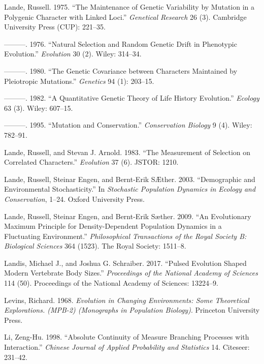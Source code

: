 \documentclass[]{article}
\begin{document}
\leavevmode\hypertarget{ref-Lande1975}{}%
Lande, Russell. 1975. ``The Maintenance of Genetic Variability by
Mutation in a Polygenic Character with Linked Loci.'' \emph{Genetical
Research} 26 (3). Cambridge University Press (CUP): 221--35.

\leavevmode\hypertarget{ref-Lande1976}{}%
---------. 1976. ``Natural Selection and Random Genetic Drift in
Phenotypic Evolution.'' \emph{Evolution} 30 (2). Wiley: 314--34.

\leavevmode\hypertarget{ref-pmid17248993}{}%
---------. 1980. ``The Genetic Covariance between Characters Maintained
by Pleiotropic Mutations.'' \emph{Genetics} 94 (1): 203--15.

\leavevmode\hypertarget{ref-Lande1982}{}%
---------. 1982. ``A Quantitative Genetic Theory of Life History
Evolution.'' \emph{Ecology} 63 (3). Wiley: 607--15.

\leavevmode\hypertarget{ref-Lande1995}{}%
---------. 1995. ``Mutation and Conservation.'' \emph{Conservation
Biology} 9 (4). Wiley: 782--91.

\leavevmode\hypertarget{ref-Lande1983}{}%
Lande, Russell, and Stevan J. Arnold. 1983. ``The Measurement of
Selection on Correlated Characters.'' \emph{Evolution} 37 (6). JSTOR:
1210.

\leavevmode\hypertarget{ref-Lande2003}{}%
Lande, Russell, Steinar Engen, and Bernt-Erik SÆther. 2003.
``Demographic and Environmental Stochasticity.'' In \emph{Stochastic
Population Dynamics in Ecology and Conservation}, 1--24. Oxford
University Press.

\leavevmode\hypertarget{ref-Lande2009}{}%
Lande, Russell, Steinar Engen, and Bernt-Erik Sæther. 2009. ``An
Evolutionary Maximum Principle for Density-Dependent Population Dynamics
in a Fluctuating Environment.'' \emph{Philosophical Transactions of the
Royal Society B: Biological Sciences} 364 (1523). The Royal Society:
1511--8.

\leavevmode\hypertarget{ref-Landis2017}{}%
Landis, Michael J., and Joshua G. Schraiber. 2017. ``Pulsed Evolution
Shaped Modern Vertebrate Body Sizes.'' \emph{Proceedings of the National
Academy of Sciences} 114 (50). Proceedings of the National Academy of
Sciences: 13224--9.

\leavevmode\hypertarget{ref-9780691080628}{}%
Levins, Richard. 1968. \emph{Evolution in Changing Environments: Some
Theoretical Explorations. (MPB-2) (Monographs in Population Biology)}.
Princeton University Press.

\leavevmode\hypertarget{ref-zeng1998absolute}{}%
Li, Zeng-Hu. 1998. ``Absolute Continuity of Measure Branching Processes
with Interaction.'' \emph{Chinese Journal of Applied Probability and
Statistics} 14. Citeseer: 231--42.
\end{document}
